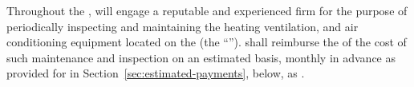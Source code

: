 \label{sec:hvac}
Throughout the \termOfLease, \lessor will engage a reputable and experienced firm for the purpose of periodically inspecting and maintaining the heating ventilation, and air conditioning equipment located on the \building (the ``\hvacMaintenance''). \lessee shall reimburse the \lesseesPercentage of the cost of such maintenance and inspection on an estimated basis, monthly in advance as provided for in Section~\ref{sec:estimated-payments}, below, as \additionalRent.
